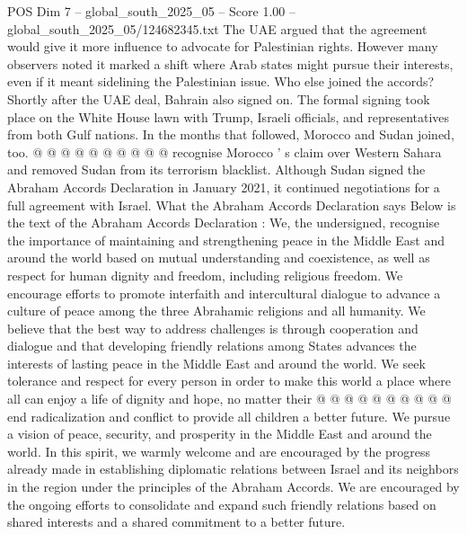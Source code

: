\begin{textsample}{POS Dim 7 – global\_south\_2025\_05 – Score 1.00 – global\_south\_2025\_05/124682345.txt}
The UAE argued that the agreement would give it more influence to advocate for Palestinian rights.
However many observers noted it marked a shift where Arab states might pursue their interests, even if it meant sidelining the Palestinian issue.
Who else joined the accords?
Shortly after the UAE deal, Bahrain also signed on.
The formal signing took place on the White House lawn with Trump, Israeli officials, and representatives from both Gulf nations.
In the months that followed, Morocco and Sudan joined, too. @ @ @ @ @ @ @ @ @ @ recognise Morocco ' s claim over Western Sahara and removed Sudan from its terrorism blacklist.
Although Sudan signed the Abraham Accords Declaration in January 2021, it continued negotiations for a full agreement with Israel.
What the Abraham Accords Declaration says Below is the text of the Abraham Accords Declaration : We, the undersigned, recognise the importance of maintaining and strengthening peace in the Middle East and around the world based on mutual understanding and coexistence, as well as respect for human dignity and freedom, including religious freedom.
We encourage efforts to promote interfaith and intercultural dialogue to advance a culture of peace among the three Abrahamic religions and all humanity.
We believe that the best way to address challenges is through cooperation and dialogue and that developing friendly relations among States advances the interests of lasting peace in the Middle East and around the world.
We seek tolerance and respect for every person in order to make this world a place where all can enjoy a life of dignity and hope, no matter their @ @ @ @ @ @ @ @ @ @ end radicalization and conflict to provide all children a better future.
We pursue a vision of peace, security, and prosperity in the Middle East and around the world.
In this spirit, we warmly welcome and are encouraged by the progress already made in establishing diplomatic relations between Israel and its neighbors in the region under the principles of the Abraham Accords.
We are encouraged by the ongoing efforts to consolidate and expand such friendly relations based on shared interests and a shared commitment to a better future.

\end{textsample}
